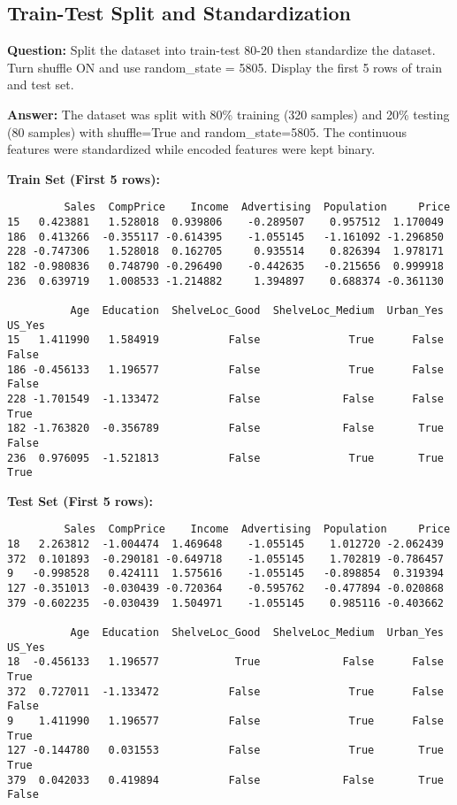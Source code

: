 \documentclass[11pt]{article}
\begin{document}
\subsection{Train-Test Split and Standardization}

\textbf{Question:} Split the dataset into train-test 80-20 then standardize the dataset. Turn shuffle ON and use random\_state = 5805. Display the first 5 rows of train and test set.

\textbf{Answer:} The dataset was split with 80\% training (320 samples) and 20\% testing (80 samples) with shuffle=True and random\_state=5805. The continuous features were standardized while encoded features were kept binary.

\textbf{Train Set (First 5 rows):}
\begin{verbatim}
         Sales  CompPrice    Income  Advertising  Population     Price
15   0.423881   1.528018  0.939806    -0.289507    0.957512  1.170049
186  0.413266  -0.355117 -0.614395    -1.055145   -1.161092 -1.296850
228 -0.747306   1.528018  0.162705     0.935514    0.826394  1.978171
182 -0.980836   0.748790 -0.296490    -0.442635   -0.215656  0.999918
236  0.639719   1.008533 -1.214882     1.394897    0.688374 -0.361130

          Age  Education  ShelveLoc_Good  ShelveLoc_Medium  Urban_Yes  US_Yes
15   1.411990   1.584919           False              True      False   False
186 -0.456133   1.196577           False              True      False   False
228 -1.701549  -1.133472           False             False      False    True
182 -1.763820  -0.356789           False             False       True   False
236  0.976095  -1.521813           False              True       True    True
\end{verbatim}

\textbf{Test Set (First 5 rows):}
\begin{verbatim}
         Sales  CompPrice    Income  Advertising  Population     Price
18   2.263812  -1.004474  1.469648    -1.055145    1.012720 -2.062439
372  0.101893  -0.290181 -0.649718    -1.055145    1.702819 -0.786457
9   -0.998528   0.424111  1.575616    -1.055145   -0.898854  0.319394
127 -0.351013  -0.030439 -0.720364    -0.595762   -0.477894 -0.020868
379 -0.602235  -0.030439  1.504971    -1.055145    0.985116 -0.403662

          Age  Education  ShelveLoc_Good  ShelveLoc_Medium  Urban_Yes  US_Yes
18  -0.456133   1.196577            True             False      False    True
372  0.727011  -1.133472           False              True      False   False
9    1.411990   1.196577           False              True      False    True
127 -0.144780   0.031553           False              True       True    True
379  0.042033   0.419894           False             False       True   False
\end{verbatim}
\end{document}
